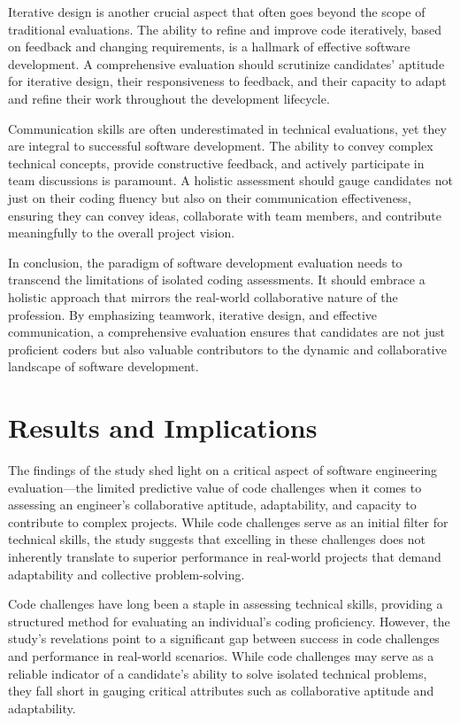 \documentclass[
    a4paper, %
    10pt, %
    unnumberedsections, %
    twoside, %
]{LTJournalArticle}
\begin{document}
Iterative design is another crucial aspect that often goes beyond the scope of traditional evaluations. The ability to refine and improve code iteratively, based on feedback and changing requirements, is a hallmark of effective software development. A comprehensive evaluation should scrutinize candidates' aptitude for iterative design, their responsiveness to feedback, and their capacity to adapt and refine their work throughout the development lifecycle.

Communication skills are often underestimated in technical evaluations, yet they are integral to successful software development. The ability to convey complex technical concepts, provide constructive feedback, and actively participate in team discussions is paramount. A holistic assessment should gauge candidates not just on their coding fluency but also on their communication effectiveness, ensuring they can convey ideas, collaborate with team members, and contribute meaningfully to the overall project vision.

In conclusion, the paradigm of software development evaluation needs to transcend the limitations of isolated coding assessments. It should embrace a holistic approach that mirrors the real-world collaborative nature of the profession. By emphasizing teamwork, iterative design, and effective communication, a comprehensive evaluation ensures that candidates are not just proficient coders but also valuable contributors to the dynamic and collaborative landscape of software development.


\section{Results and Implications}

The findings of the study shed light on a critical aspect of software engineering evaluation—the limited predictive value of code challenges when it comes to assessing an engineer's collaborative aptitude, adaptability, and capacity to contribute to complex projects. While code challenges serve as an initial filter for technical skills, the study suggests that excelling in these challenges does not inherently translate to superior performance in real-world projects that demand adaptability and collective problem-solving.

Code challenges have long been a staple in assessing technical skills, providing a structured method for evaluating an individual's coding proficiency. However, the study's revelations point to a significant gap between success in code challenges and performance in real-world scenarios. While code challenges may serve as a reliable indicator of a candidate's ability to solve isolated technical problems, they fall short in gauging critical attributes such as collaborative aptitude and adaptability.
\end{document}
